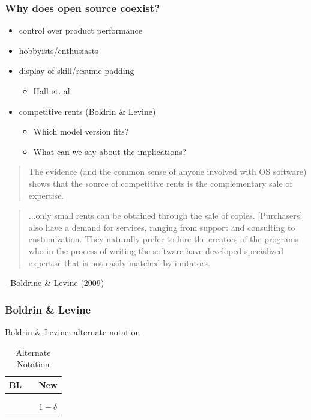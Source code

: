 \documentclass{beamer}
\begin{document}
\begin{frame}
  \frametitle{Why does open source coexist?}
  \begin{itemize}
    \item control over product performance
    \item hobbyists/enthusiasts
    \item display of skill/resume padding
	\begin{itemize}
		\item Hall et. al
	\end{itemize}
	\item competitive rents (Boldrin \& Levine)
	\begin{itemize}
		\item Which model version fits?
		\item What can we say about the implications? 
	\end{itemize}
  \end{itemize}
\end{frame}

\begin{frame}
  \begin{quotation}
    The evidence (and the common sense of anyone involved with OS software) shows   that the source of competitive rents is the complementary sale of expertise.
  \end{quotation}
  \begin{quotation}
	  ...only small rents can be obtained through the sale of copies. [Purchasers] also have a demand for services, ranging from support and consulting to customization. They naturally prefer to hire the creators of the programs who in the process of writing the software have developed specialized expertise that is not easily matched by imitators.
  \end{quotation}
  - Boldrine \& Levine (2009)
\end{frame}

\begin{frame}
  \frametitle{Boldrin \& Levine}
  Boldrin \& Levine: alternate notation\\
  \begin{table}[ht]
    \caption{Alternate Notation}
    \centering
	\begin{tabular}{c c c}
	  \hline\hline
      BL &  & New\\ [0.5ex] 
	  \hline
	  \delta & \longrightarrow & \beta  \\ 
	  \beta & \longrightarrow & \lambda \\
	  \zeta & \longrightarrow & $1 - \delta$ \\[1ex] 
	  \hline
	 \end{tabular}
	 \label{table:altnot}
  \end{table}
\end{frame}
\end{document}
